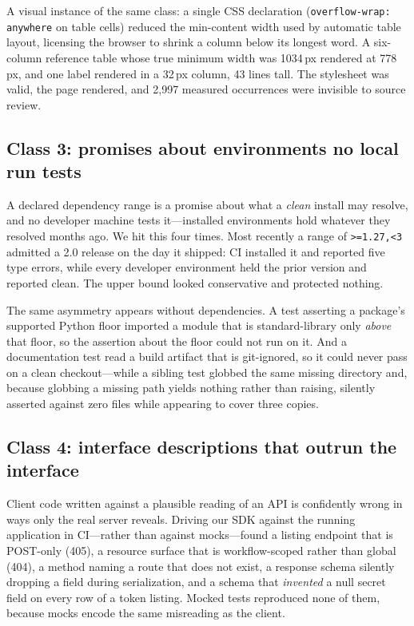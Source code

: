 \documentclass{article}
\newcommand{\code}[1]{\texttt{#1}}
\begin{document}
A visual instance of the same class: a single CSS declaration
(\code{overflow-wrap: anywhere} on table cells) reduced the min-content width used
by automatic table layout, licensing the browser to shrink a column below its
longest word. A six-column reference table whose true minimum width was 1034\,px
rendered at 778\,px, and one label rendered in a 32\,px column, 43 lines tall.
The stylesheet was valid, the page rendered, and 2{,}997 measured occurrences were
invisible to source review.

\subsection{Class 3: promises about environments no local run tests}

A declared dependency range is a promise about what a \emph{clean} install may
resolve, and no developer machine tests it---installed environments hold whatever
they resolved months ago. We hit this four times. Most recently a range of
\code{>=1.27,<3} admitted a 2.0 release on the day it shipped: CI installed it and
reported five type errors, while every developer environment held the prior version
and reported clean. The upper bound looked conservative and protected nothing.

The same asymmetry appears without dependencies. A test asserting a package's
supported Python floor imported a module that is standard-library only \emph{above}
that floor, so the assertion about the floor could not run on it. And a
documentation test read a build artifact that is git-ignored, so it could never pass
on a clean checkout---while a sibling test globbed the same missing directory and,
because globbing a missing path yields nothing rather than raising, silently
asserted against zero files while appearing to cover three copies.

\subsection{Class 4: interface descriptions that outrun the interface}

Client code written against a plausible reading of an API is confidently wrong in
ways only the real server reveals. Driving our SDK against the running application
in CI---rather than against mocks---found a listing endpoint that is POST-only (405),
a resource surface that is workflow-scoped rather than global (404), a method naming
a route that does not exist, a response schema silently dropping a field during
serialization, and a schema that \emph{invented} a null secret field on every row of
a token listing. Mocked tests reproduced none of them, because mocks encode the same
misreading as the client.
\end{document}
